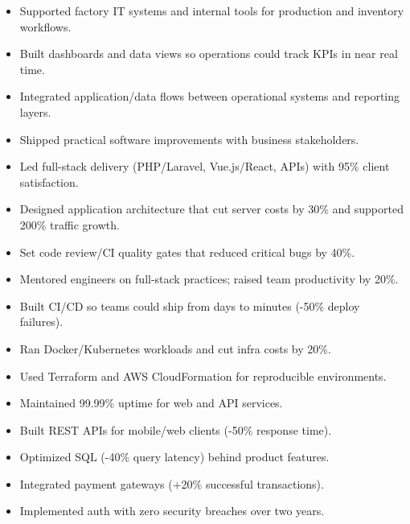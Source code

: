 \begin{itemize}
  \item Supported factory IT systems and internal tools for production and inventory workflows.
  \item Built dashboards and data views so operations could track KPIs in near real time.
  \item Integrated application/data flows between operational systems and reporting layers.
  \item Shipped practical software improvements with business stakeholders.
\end{itemize}
\vspace{4pt}
\begin{itemize}
  \item Led full-stack delivery (PHP/Laravel, Vue.js/React, APIs) with 95\% client satisfaction.
  \item Designed application architecture that cut server costs by 30\% and supported 200\% traffic growth.
  \item Set code review/CI quality gates that reduced critical bugs by 40\%.
  \item Mentored engineers on full-stack practices; raised team productivity by 20\%.
\end{itemize}
\vspace{4pt}
\begin{itemize}
  \item Built CI/CD so teams could ship from days to minutes (-50\% deploy failures).
  \item Ran Docker/Kubernetes workloads and cut infra costs by 20\%.
  \item Used Terraform and AWS CloudFormation for reproducible environments.
  \item Maintained 99.99\% uptime for web and API services.
\end{itemize}
\vspace{4pt}
\begin{itemize}
  \item Built REST APIs for mobile/web clients (-50\% response time).
  \item Optimized SQL (-40\% query latency) behind product features.
  \item Integrated payment gateways (+20\% successful transactions).
  \item Implemented auth with zero security breaches over two years.
\end{itemize}
